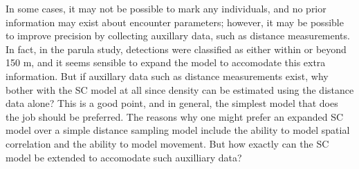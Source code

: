 In some cases, it may not be possible to mark any individuals, and no
prior information may exist about encounter parameters; however, it
may be possible to improve precision %
by collecting
auxillary data, such as distance
measurements. In fact, in the parula study, detections were classified
as either within or beyond 150 m, and it seems sensible to expand the
model to accomodate this extra information.
But if auxillary data such as distance measurements exist, why
bother with the SC model at all since density can be estimated using
the distance data alone? This is a good point, and in general, the
simplest model that does the job should be preferred.
The reasons why one might prefer an expanded SC model over a simple
distance sampling model include the ability to model spatial
correlation and the ability to model movement. But how exactly can the
SC model be extended to accomodate such auxilliary data?


